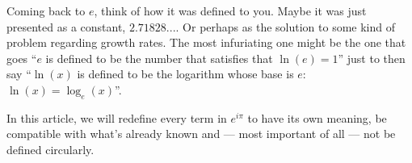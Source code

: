 Coming back to $e$, think of how it was defined to you. Maybe it was just presented as a constant, $2.71828...$. Or perhaps as the solution to some kind of problem regarding growth rates. The most infuriating one might be the one that goes \enquote{$e$ is defined to be the number that satisfies that $\ln(e) = 1$} just to then say \enquote{$\ln(x)$ is defined to be the logarithm whose base is $e$: $\ln(x) = \log_e(x)$}.

In this article, we will redefine every term in $e^{i\pi}$ to have its own meaning, be compatible with what's already known and --- most important of all --- not be defined circularly.

\newpage
